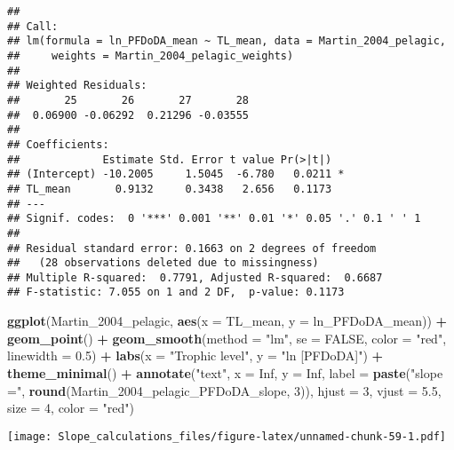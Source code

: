\documentclass[
]{article}
\newenvironment{Shaded}{\begin{snugshade}}{\end{snugshade}}
\newcommand{\AttributeTok}[1]{\textcolor[rgb]{0.13,0.29,0.53}{#1}}
\newcommand{\ConstantTok}[1]{\textcolor[rgb]{0.56,0.35,0.01}{#1}}
\newcommand{\DecValTok}[1]{\textcolor[rgb]{0.00,0.00,0.81}{#1}}
\newcommand{\FloatTok}[1]{\textcolor[rgb]{0.00,0.00,0.81}{#1}}
\newcommand{\FunctionTok}[1]{\textcolor[rgb]{0.13,0.29,0.53}{\textbf{#1}}}
\newcommand{\NormalTok}[1]{#1}
\newcommand{\SpecialCharTok}[1]{\textcolor[rgb]{0.81,0.36,0.00}{\textbf{#1}}}
\newcommand{\StringTok}[1]{\textcolor[rgb]{0.31,0.60,0.02}{#1}}
\begin{document}
\begin{verbatim}
## 
## Call:
## lm(formula = ln_PFDoDA_mean ~ TL_mean, data = Martin_2004_pelagic, 
##     weights = Martin_2004_pelagic_weights)
## 
## Weighted Residuals:
##       25       26       27       28 
##  0.06900 -0.06292  0.21296 -0.03555 
## 
## Coefficients:
##             Estimate Std. Error t value Pr(>|t|)  
## (Intercept) -10.2005     1.5045  -6.780   0.0211 *
## TL_mean       0.9132     0.3438   2.656   0.1173  
## ---
## Signif. codes:  0 '***' 0.001 '**' 0.01 '*' 0.05 '.' 0.1 ' ' 1
## 
## Residual standard error: 0.1663 on 2 degrees of freedom
##   (28 observations deleted due to missingness)
## Multiple R-squared:  0.7791, Adjusted R-squared:  0.6687 
## F-statistic: 7.055 on 1 and 2 DF,  p-value: 0.1173
\end{verbatim}

\begin{Shaded}
\begin{Highlighting}[]
\FunctionTok{ggplot}\NormalTok{(Martin\_2004\_pelagic, }\FunctionTok{aes}\NormalTok{(}\AttributeTok{x =}\NormalTok{ TL\_mean, }\AttributeTok{y =}\NormalTok{ ln\_PFDoDA\_mean)) }\SpecialCharTok{+}
  \FunctionTok{geom\_point}\NormalTok{() }\SpecialCharTok{+}
  \FunctionTok{geom\_smooth}\NormalTok{(}\AttributeTok{method =} \StringTok{"lm"}\NormalTok{, }\AttributeTok{se =} \ConstantTok{FALSE}\NormalTok{, }\AttributeTok{color =} \StringTok{"red"}\NormalTok{, }\AttributeTok{linewidth =} \FloatTok{0.5}\NormalTok{) }\SpecialCharTok{+}
  \FunctionTok{labs}\NormalTok{(}\AttributeTok{x =} \StringTok{"Trophic level"}\NormalTok{,}
       \AttributeTok{y =} \StringTok{"ln [PFDoDA]"}\NormalTok{) }\SpecialCharTok{+}
  \FunctionTok{theme\_minimal}\NormalTok{() }\SpecialCharTok{+}
  \FunctionTok{annotate}\NormalTok{(}\StringTok{"text"}\NormalTok{, }\AttributeTok{x =} \ConstantTok{Inf}\NormalTok{, }\AttributeTok{y =} \ConstantTok{Inf}\NormalTok{, }\AttributeTok{label =} \FunctionTok{paste}\NormalTok{(}\StringTok{"slope ="}\NormalTok{, }\FunctionTok{round}\NormalTok{(Martin\_2004\_pelagic\_PFDoDA\_slope, }\DecValTok{3}\NormalTok{)), }
           \AttributeTok{hjust =} \DecValTok{3}\NormalTok{, }\AttributeTok{vjust =} \FloatTok{5.5}\NormalTok{, }\AttributeTok{size =} \DecValTok{4}\NormalTok{, }\AttributeTok{color =} \StringTok{"red"}\NormalTok{)}
\end{Highlighting}
\end{Shaded}

\texttt{[image: Slope\_calculations\_files/figure-latex/unnamed-chunk-59-1.pdf]}
\end{document}
